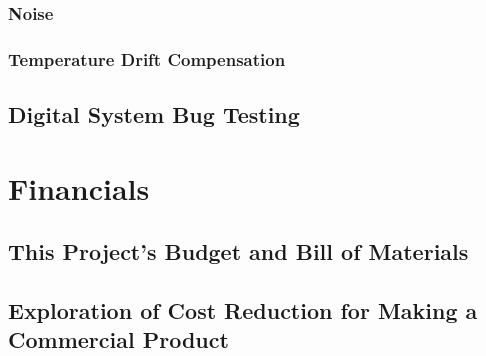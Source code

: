 \documentclass[11pt, letterpaper,titlepage]{article}
\begin{document}
\subsubsection{Noise}
\subsubsection{Temperature Drift Compensation}
\subsection{Digital System Bug Testing}

\newpage
\section{Financials}
\subsection{This Project's Budget and Bill of Materials}
\subsection{Exploration of Cost Reduction for Making a Commercial Product}
\end{document}
